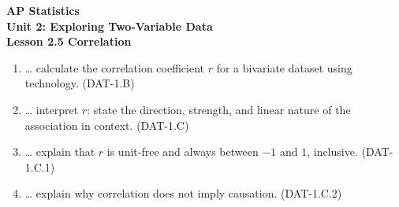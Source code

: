 \documentclass[10pt]{article}
\begin{document}
\vspace{-0.8in}

\begin{center}
  {\color{white}\textbf{\LARGE AP Statistics}}\\[4pt]
  {\color{skymid}\large\textbf{Unit 2: Exploring Two-Variable Data}}\\[6pt]
  {\color{white}\textbf{\large Lesson 2.5 \quad Correlation}}
\end{center}

\vspace{0.22in}
\namedateperiod
\vspace{0.18in}

\begin{learningtargetbox}
\small
\begin{enumerate}[leftmargin=1.5em, itemsep=5pt]
  \item \ldots{} calculate the correlation coefficient $r$ for a bivariate dataset using
        technology. \hfill\textcolor{slate}{\small(DAT-1.B)}
  \item \ldots{} interpret $r$: state the direction, strength, and linear nature of the
        association in context. \hfill\textcolor{slate}{\small(DAT-1.C)}
  \item \ldots{} explain that $r$ is unit-free and always between $-1$ and $1$, inclusive.
        \hfill\textcolor{slate}{\small(DAT-1.C.1)}
  \item \ldots{} explain why correlation does not imply causation.
        \hfill\textcolor{slate}{\small(DAT-1.C.2)}
\end{enumerate}
\end{learningtargetbox}

\vspace{0.14in}
\end{document}
